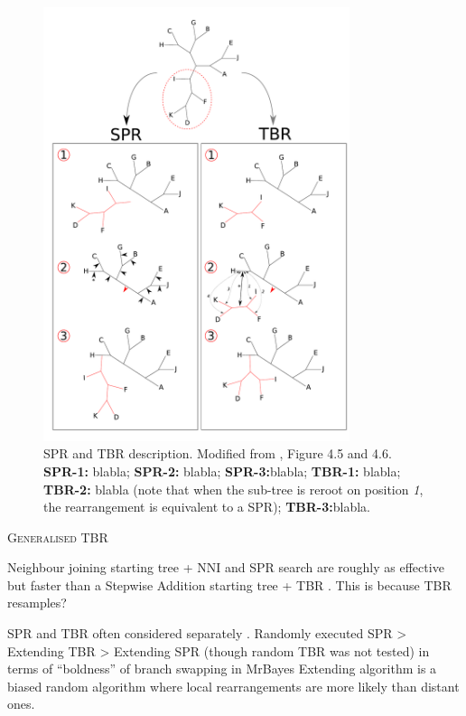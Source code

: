 \documentclass[12pt,letterpaper]{article}
\renewcommand{\section}[1]{%
\bigskip
\begin{center}
\begin{Large}
\normalfont\scshape #1
\medskip
\end{Large}
\end{center}}
\begin{document}
\begin{figure}[!htbp]
\centering
   \includegraphics[width=0.8\textwidth]{Figure/FelsensteinFigure.pdf}
\caption{\scriptsize{SPR and TBR description. Modified from \cite{felsenstein2004inferring}, Figure 4.5 and 4.6. \textbf{SPR-1:} blabla; \textbf{SPR-2:} blabla; \textbf{SPR-3:}blabla; \textbf{TBR-1:} blabla; \textbf{TBR-2:} blabla (note that when the sub-tree is reroot on position \textit{1}, the rearrangement is equivalent to a SPR); \textbf{TBR-3:}blabla.}}
\label{Figure_Felsenstein}
\end{figure}

\section{Generalised TBR}

Neighbour joining starting tree + NNI and SPR search are roughly as effective but faster than a Stepwise Addition starting tree + TBR \citep{morrison2007increasing}. This is because TBR resamples?

SPR and TBR often considered separately \citep[e.g.][]{lakner2008efficiency}.
Randomly executed SPR > Extending TBR > Extending SPR (though random TBR was not tested) in terms of ``boldness'' of branch swapping in MrBayes \citep{lakner2008efficiency}
Extending algorithm is a biased random algorithm where local rearrangements are more likely than distant ones.
\end{document}
